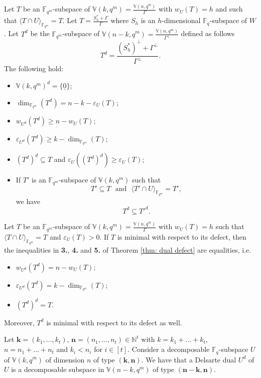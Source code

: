 \documentclass[10pt,a4paper]{amsart}
\newcommand{\fqm}{\mathbb{F}_{q^m}}
\newcommand{\fq}{{\mathbb F}_{q}}
\begin{document}
\begin{theorem} \label{thm: dual defect}
Let  $T$ be an $\fqm$-subspace of $\mathbb{V}(k,q^m)=\frac{\mathbb{V}(n,q^m)}{\Gamma}$ with $w_{U}(T)=h$ and such that $\langle T \cap U \rangle_{\fqm}=T$. Let $T=\frac{S_h^*+\Gamma}{\Gamma}$ where $S_h$ is an $h$-dimensional $\fq$-subspace of $W$. Let $T^d$ be the $\fqm$-subspace of $\mathbb{V}(n-k,q^m)=\frac{\mathbb{V}(n,q^m)}{\Gamma^\perp}$ defined as follows
\begin{equation} \label{eq:T^d}
T^d= \frac{(S_h^*)^\perp+\Gamma^\perp}{\Gamma^\perp}.   \end{equation} 
The following hold:
\begin{itemize}
    \item[\bf 1.] $\mathbb{V}(k,q^m)^d=\{ \underline 0\}$;
    \item[\bf 2.]  $\dim_{\fqm} (T^d)=n-k-\varepsilon_{U}(T)$;
    \item[\bf 3.] $w_{U^d}(T^d)\geq n-w_{U}(T)$;
    \item[\bf 4.] $\varepsilon_{U^d}(T^d)\geq k- \dim_{\fqm} (T)$;
    \item[\bf 5.] $(T^d)^d \subseteq T$ and $\varepsilon_{U}((T^d)^d)\geq \varepsilon_{U}(T)$;
    \item[\bf 6.] If $T'$ is an $\fqm$-subspace of $\mathbb{V}(k,q^m)$ such that
    \[T'\subseteq T \,\,\,\, \mbox{and} \,\,\,\, \langle T' \cap U \rangle_{\fqm}=T',\]
we have
\[T^d\subseteq T'^d.\]
\end{itemize}
\end{theorem}

\begin{theorem} \label{thm: =dual defect}
Let $T$ be an $\fqm$-subspace of $\mathbb{V}(k,q^m)=\frac{\mathbb{V}(n,q^m)}{\Gamma}$ with $w_{U}(T)=h$ such that $\langle T \cap U \rangle_{\fqm}=T$ and $\varepsilon_{U}(T)>0$. If $T$ is minimal with respect to its defect, then the inequalities in {\bf 3.}, {\bf 4.} and {\bf 5.} of Theorem \ref{thm: dual defect} are equalities, i.e.
\begin{itemize}  
    \item[\bf 1.] $w_{U^d}(T^d) =n-w_{U}(T)$;
    \item[\bf 2.] $\varepsilon_{U^d}(T^d)=k- \dim_{\fqm} (T)$;
    \item[\bf 3.] $(T^d)^d = T$.    
\end{itemize}
Moreover, $T^d$ is minimal with respect to its defect as well.
\end{theorem}

\begin{theorem}
    Let $\mathbf{k}=(k_1,\ldots,k_t)$,  $\mathbf{n}=(n_1,\ldots,n_t)\in\mathbb N^t$ with $k=k_1+\ldots+k_t$,  $n=n_1+\ldots+n_t$  and $k_i< n_i$ for $i\in [t]$. Consider a decomposable $\fq$-subspace $U$ of $\mathbb{V}(k,q^m)$ of dimension $n$  of type $(\mathbf{k}, \mathbf{n})$.
    We have that a Delsarte dual $U^d$ of $U$ is a decomposable subspace in $\mathbb{V}(n-k,q^m)$ of type $(\mathbf{n}-\mathbf{k}, \mathbf{n})$.
\end{theorem}
\end{document}
